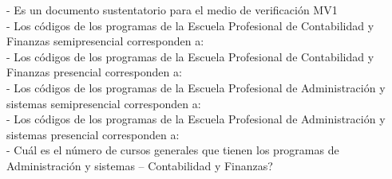 -	Es un documento sustentatorio para el medio de verificación MV1 \\
-	Los códigos de los programas de la Escuela Profesional de Contabilidad y Finanzas semipresencial corresponden a:\\ 
-	Los códigos de los programas de la Escuela Profesional de Contabilidad y Finanzas presencial corresponden a: \\
-	Los códigos de los programas de la Escuela Profesional de Administración y sistemas semipresencial corresponden a:\\ 
-	Los códigos de los programas de la Escuela Profesional de Administración y sistemas presencial corresponden a: \\
-	Cuál es el número de cursos generales que tienen los programas de Administración y sistemas – Contabilidad y Finanzas?\
